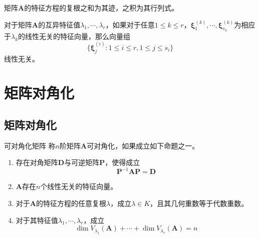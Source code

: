 \documentclass[lang = cn, scheme = chinese, thmcnt = section]{elegantbook}
\newcommand{\bs}{\boldsymbol}          %
\begin{document}
\begin{theorem}
	矩阵$\bs{A}$的特征方程的复根之和为其迹，之积为其行列式。
\end{theorem}

\begin{theorem}
	对于矩阵$\bs{A}$的互异特征值$\lambda_1,\cdots,\lambda_r$，如果对于任意$1\le k \le r$，$\bs{\xi}_{1}^{(k)},\cdots,\bs{\xi}_{s_k}^{(k)}$为相应于$\lambda_k$的线性无关的特征向量，那么向量组
	$$
	\{ \bs{\xi}_{j}^{(i)}:1\le i \le r,1\le j \le s_i \}
	$$
	线性无关。
\end{theorem}

\section{矩阵对角化}

\subsection{矩阵对角化}

\begin{definition}{可对角化矩阵}
	称$n$阶矩阵$\bs{A}$可对角化，如果成立如下命题之一。
	\begin{enumerate}
		\item 存在对角矩阵$\bs{D}$与可逆矩阵$\bs{P}$，使得成立
		$$
		\bs{P}^{-1}\bs{AP}=\bs{D}
		$$
		\item $\bs{A}$存在$n$个线性无关的特征向量。
		\item 对于$\bs{A}$的特征方程的任意复根$\lambda$，成立$\lambda\in K$，且其几何重数等于代数重数。
		\item 对于其特征值$\lambda_1,\cdots,\lambda_r$，成立
		$$
		\dim V_{\lambda_1}(\bs{A})+\cdots+\dim V_{\lambda_r}(\bs{A})=n
		$$
	\end{enumerate}
\end{definition}
\end{document}
